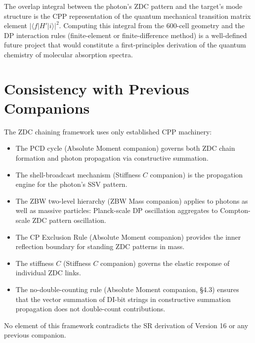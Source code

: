 \documentclass[12pt]{article}
\begin{document}
The overlap integral between the photon’s ZDC pattern and the target’s mode structure is the CPP representation of the quantum mechanical transition matrix element \(|\langle f|H'|i\rangle|^2\). Computing this integral from the 600-cell geometry and the DP interaction rules (finite-element or finite-difference method) is a well-defined future project that would constitute a first-principles derivation of the quantum chemistry of molecular absorption spectra.

\section{Consistency with Previous Companions}
The ZDC chaining framework uses only established CPP machinery:
\begin{itemize}
\item The PCD cycle (Absolute Moment companion) governs both ZDC chain formation and photon propagation via constructive summation.
\item The shell-broadcast mechanism (Stiffness \(C\) companion) is the propagation engine for the photon’s SSV pattern.
\item The ZBW two-level hierarchy (ZBW Mass companion) applies to photons as well as massive particles: Planck-scale DP oscillation aggregates to Compton-scale ZDC pattern oscillation.
\item The CP Exclusion Rule (Absolute Moment companion) provides the inner reflection boundary for standing ZDC patterns in mass.
\item The stiffness \(C\) (Stiffness \(C\) companion) governs the elastic response of individual ZDC links.
\item The no-double-counting rule (Absolute Moment companion, §4.3) ensures that the vector summation of DI-bit strings in constructive summation propagation does not double-count contributions.
\end{itemize}

No element of this framework contradicts the SR derivation of Version 16 or any previous companion.
\end{document}
